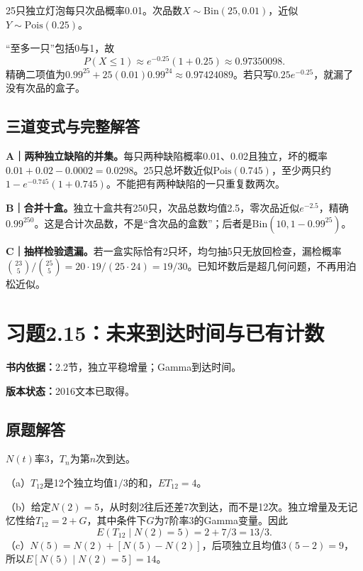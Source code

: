 \documentclass[
  11pt,
  a4paper,
  UTF8,fontset=fandol]{ctexart}
\let\OldSection\section
\renewcommand{\section}{\Needspace{7\baselineskip}\OldSection}
\let\OldSubsection\subsection
\renewcommand{\subsection}{\Needspace{5\baselineskip}\OldSubsection}
\begin{document}
25只独立灯泡每只次品概率0.01。次品数\(X\sim\mathrm{Bin}(25,0.01)\)，近似\(Y\sim\mathrm{Pois}(0.25)\)。

``至多一只''包括0与1，故
\[\boxed{P(X\le1)\approx e^{-0.25}(1+0.25)\approx0.97350098.}\]
精确二项值为\(0.99^{25}+25(0.01)0.99^{24}\approx0.97424089\)。若只写\(0.25e^{-0.25}\)，就漏了没有次品的盒子。

\subsection{三道变式与完整解答}\label{ux4e09ux9053ux53d8ux5f0fux4e0eux5b8cux6574ux89e3ux7b54-13}

\textbf{A｜两种独立缺陷的并集。}每只两种缺陷概率0.01、0.02且独立，坏的概率\(0.01+0.02-0.0002=0.0298\)。25只总坏数近似\(\mathrm{Pois}(0.745)\)，至少两只约\(1-e^{-0.745}(1+0.745)\)。不能把有两种缺陷的一只重复数两次。

\textbf{B｜合并十盒。}独立十盒共有250只，次品总数均值2.5，零次品近似\(e^{-2.5}\)，精确\(0.99^{250}\)。这是合计次品数，不是``含次品的盒数''；后者是\(\mathrm{Bin}(10,1-0.99^{25})\)。

\textbf{C｜抽样检验遗漏。}若一盒实际恰有2只坏，均匀抽5只无放回检查，漏检概率\(\binom{23}{5}/\binom{25}{5}=20\cdot19/(25\cdot24)=19/30\)。已知坏数后是超几何问题，不再用泊松近似。

\newpage

\section{习题2.15：未来到达时间与已有计数}\label{ux4e60ux98982.15ux672aux6765ux5230ux8fbeux65f6ux95f4ux4e0eux5df2ux6709ux8ba1ux6570}

\textbf{书内依据：}2.2节，独立平稳增量；Gamma到达时间。

\textbf{版本状态：}2016文本已取得。

\subsection{原题解答}\label{ux539fux9898ux89e3ux7b54-14}

\(N(t)\)率3，\(T_n\)为第\(n\)次到达。

（a）\(T_{12}\)是12个独立均值\(1/3\)的和，\(\boxed{ET_{12}=4}\)。

（b）给定\(N(2)=5\)，从时刻2往后还差7次到达，而不是12次。独立增量及无记忆性给\(T_{12}=2+G\)，其中条件下\(G\)为7阶率3的Gamma变量。因此
\[\boxed{E(T_{12}\mid N(2)=5)=2+7/3=13/3.}\]
（c）\(N(5)=N(2)+[N(5)-N(2)]\)，后项独立且均值\(3(5-2)=9\)，所以\(\boxed{E[N(5)\mid N(2)=5]=14}\)。
\end{document}
